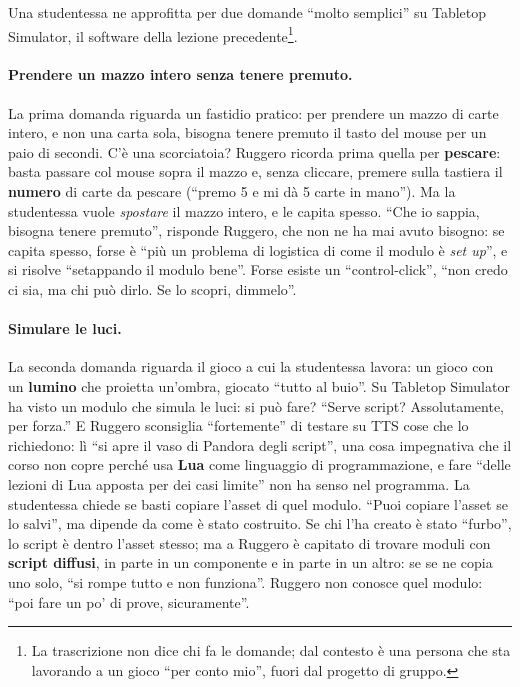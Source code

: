 Una studentessa ne approfitta per due domande ``molto semplici'' su Tabletop
Simulator, il software della lezione precedente\footnote{La trascrizione non dice chi
fa le domande; dal contesto è una persona che sta lavorando a un gioco ``per conto
mio'', fuori dal progetto di gruppo.}.

\paragraph{Prendere un mazzo intero senza tenere premuto.} La prima domanda riguarda
un fastidio pratico: per prendere un mazzo di carte intero, e non una carta sola,
bisogna tenere premuto il tasto del mouse per un paio di secondi. C'è una scorciatoia?
Ruggero ricorda prima quella per \textbf{pescare}: basta passare col mouse sopra il
mazzo e, senza cliccare, premere sulla tastiera il \textbf{numero} di carte da pescare
(``premo 5 e mi dà 5 carte in mano''). Ma la studentessa vuole \emph{spostare} il mazzo
intero, e le capita spesso. ``Che io sappia, bisogna tenere premuto'', risponde
Ruggero, che non ne ha mai avuto bisogno: se capita spesso, forse è ``più un problema
di logistica di come il modulo è \emph{set up}'', e si risolve ``setappando il modulo
bene''. Forse esiste un ``control-click'', ``non credo ci sia, ma chi può dirlo. Se lo
scopri, dimmelo''.

\paragraph{Simulare le luci.} La seconda domanda riguarda il gioco a cui la
studentessa lavora: un gioco con un \textbf{lumino} che proietta un'ombra, giocato
``tutto al buio''. Su Tabletop Simulator ha visto un modulo che simula le luci: si può
fare? ``Serve script? Assolutamente, per forza.'' E Ruggero sconsiglia ``fortemente''
di testare su TTS cose che lo richiedono: lì ``si apre il vaso di Pandora degli
script'', una cosa impegnativa che il corso non copre perché usa \textbf{Lua} come
linguaggio di programmazione, e fare ``delle lezioni di Lua apposta per dei casi
limite'' non ha senso nel programma. La studentessa chiede se basti copiare l'asset di
quel modulo. ``Puoi copiare l'asset se lo salvi'', ma dipende da come è stato
costruito. Se chi l'ha creato è stato ``furbo'', lo script è dentro l'asset stesso; ma
a Ruggero è capitato di trovare moduli con \textbf{script diffusi}, in parte in un
componente e in parte in un altro: se se ne copia uno solo, ``si rompe tutto e non
funziona''. Ruggero non conosce quel modulo: ``poi fare un po' di prove, sicuramente''.

